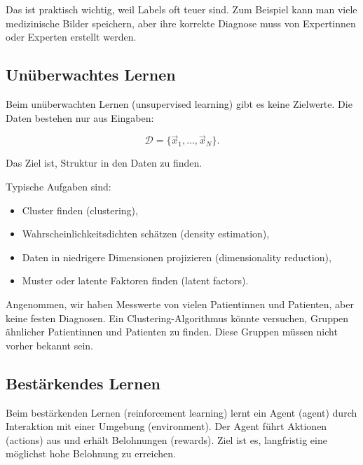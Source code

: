 Das ist praktisch wichtig, weil Labels oft teuer sind.
Zum Beispiel kann man viele medizinische Bilder speichern, aber ihre korrekte Diagnose muss von Expertinnen oder Experten erstellt werden.

\subsection{Unüberwachtes Lernen}

\begin{definitionbox}
Beim unüberwachten Lernen (unsupervised learning) gibt es keine Zielwerte.
Die Daten bestehen nur aus Eingaben:

\[
    \mathcal{D}
    =
    \{\vec{x}_1,\dots,\vec{x}_N\}.
\]

Das Ziel ist, Struktur in den Daten zu finden.
\end{definitionbox}

Typische Aufgaben sind:

\begin{itemize}
    \item Cluster finden (clustering),
    \item Wahrscheinlichkeitsdichten schätzen (density estimation),
    \item Daten in niedrigere Dimensionen projizieren (dimensionality reduction),
    \item Muster oder latente Faktoren finden (latent factors).
\end{itemize}

\begin{examplebox}
Angenommen, wir haben Messwerte von vielen Patientinnen und Patienten, aber keine festen Diagnosen.
Ein Clustering-Algorithmus könnte versuchen, Gruppen ähnlicher Patientinnen und Patienten zu finden.
Diese Gruppen müssen nicht vorher bekannt sein.
\end{examplebox}

\subsection{Bestärkendes Lernen}

\begin{definitionbox}
Beim bestärkenden Lernen (reinforcement learning) lernt ein Agent (agent) durch Interaktion mit einer Umgebung (environment).
Der Agent führt Aktionen (actions) aus und erhält Belohnungen (rewards).
Ziel ist es, langfristig eine möglichst hohe Belohnung zu erreichen.
\end{definitionbox}

